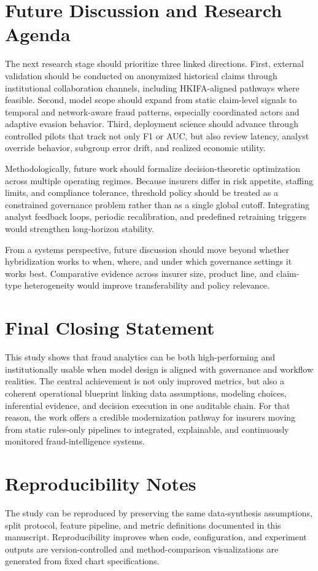 \documentclass[12pt,a4paper]{report}
\begin{document}
\section{Future Discussion and Research Agenda}
The next research stage should prioritize three linked directions. First, external validation should be conducted on anonymized historical claims through institutional collaboration channels, including HKIFA-aligned pathways where feasible. Second, model scope should expand from static claim-level signals to temporal and network-aware fraud patterns, especially coordinated actors and adaptive evasion behavior. Third, deployment science should advance through controlled pilots that track not only F1 or AUC, but also review latency, analyst override behavior, subgroup error drift, and realized economic utility.

Methodologically, future work should formalize decision-theoretic optimization across multiple operating regimes. Because insurers differ in risk appetite, staffing limits, and compliance tolerance, threshold policy should be treated as a constrained governance problem rather than as a single global cutoff. Integrating analyst feedback loops, periodic recalibration, and predefined retraining triggers would strengthen long-horizon stability.

From a systems perspective, future discussion should move beyond whether hybridization works to when, where, and under which governance settings it works best. Comparative evidence across insurer size, product line, and claim-type heterogeneity would improve transferability and policy relevance.

\section{Final Closing Statement}
This study shows that fraud analytics can be both high-performing and institutionally usable when model design is aligned with governance and workflow realities. The central achievement is not only improved metrics, but also a coherent operational blueprint linking data assumptions, modeling choices, inferential evidence, and decision execution in one auditable chain. For that reason, the work offers a credible modernization pathway for insurers moving from static rules-only pipelines to integrated, explainable, and continuously monitored fraud-intelligence systems.

\section{Reproducibility Notes}
The study can be reproduced by preserving the same data-synthesis assumptions, split protocol, feature pipeline, and metric definitions documented in this manuscript. Reproducibility improves when code, configuration, and experiment outputs are version-controlled and method-comparison visualizations are generated from fixed chart specifications.
\end{document}
